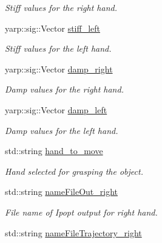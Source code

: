 \begin{DoxyCompactItemize}
\begin{DoxyCompactList}\small\item\em Stiff values for the right hand. \end{DoxyCompactList}\item 
yarp\+::sig\+::\+Vector \hyperlink{classGraspingModule_a39f2ad508bb3f5baeac30684cd57bf44}{stiff\+\_\+left}\label{classGraspingModule_a39f2ad508bb3f5baeac30684cd57bf44}

\begin{DoxyCompactList}\small\item\em Stiff values for the left hand. \end{DoxyCompactList}\item 
yarp\+::sig\+::\+Vector \hyperlink{classGraspingModule_af7690eeb0850a02dc05e20e4c4326dd4}{damp\+\_\+right}\label{classGraspingModule_af7690eeb0850a02dc05e20e4c4326dd4}

\begin{DoxyCompactList}\small\item\em Damp values for the right hand. \end{DoxyCompactList}\item 
yarp\+::sig\+::\+Vector \hyperlink{classGraspingModule_ad4dda6219b8a0bf9636c7bf58effc14b}{damp\+\_\+left}\label{classGraspingModule_ad4dda6219b8a0bf9636c7bf58effc14b}

\begin{DoxyCompactList}\small\item\em Damp values for the left hand. \end{DoxyCompactList}\item 
std\+::string \hyperlink{classGraspingModule_af119be2a7acbb0568d1c08f4f6069928}{hand\+\_\+to\+\_\+move}\label{classGraspingModule_af119be2a7acbb0568d1c08f4f6069928}

\begin{DoxyCompactList}\small\item\em Hand selected for grasping the object. \end{DoxyCompactList}\item 
std\+::string \hyperlink{classGraspingModule_a627ae74edcebd1e63427d1923bf07004}{name\+File\+Out\+\_\+right}\label{classGraspingModule_a627ae74edcebd1e63427d1923bf07004}

\begin{DoxyCompactList}\small\item\em File name of Ipopt output for right hand. \end{DoxyCompactList}\item 
std\+::string \hyperlink{classGraspingModule_a2d67456b32002aeca338be1844e5fe79}{name\+File\+Trajectory\+\_\+right}\label{classGraspingModule_a2d67456b32002aeca338be1844e5fe79}


\end{DoxyCompactItemize}
